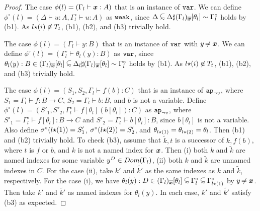\begin{proof}
  The case $\phi(l)= (\Gamma_l\vdash \boldsymbol{x}:A)$ that is an instance of ${\tt var}$.
  We can define $\phi^\circ(l) = (\Delta\vdash u:A, \Gamma^\circ_l\vdash u:A)$ as ${\tt weak}$,
  since $\Delta\subseteqsim \mergeCtx{\Delta}{\Restrict{(\Gamma_l)}{\overline{\xx}}[\theta_l]} \sim \Gamma^\circ_l$
  holds by (b1). 
  As $l{\star}(i)\not\in T_t$, (b1), (b2), and (b3) trivially hold.
  
  The case $\phi(l) = (\Gamma_l\vdash y:B)$ that is an instance of ${\tt var}$ with $y \not\nobreak\mkern -2mu = \boldsymbol{x}$. 
  We can define $\phi^\circ(l) = (\Gamma^\circ_l\vdash \theta_l(y):B)$ as ${\tt var}$,
  since $\theta_l(y):B \in \Restrict{(\Gamma_l)}{\overline{\xx}}[\theta_l] \subseteqsim \mergeCtx{\Delta_l}{\Restrict{(\Gamma_l)}{\overline{\xx}}[\theta_l]} \sim \Gamma^\circ_l$ holds by (b1).
  As $l{\star}(i)\not\in T_t$, (b1), (b2), and (b3) trivially hold.

  The case $\phi(l) = (S_1,S_2,\Gamma_l\vdash f(b):C)$ that is an instance of $\apnotvar$,
  where $S_1 = \Gamma_l\vdash f:B\to C$, $S_2 = \Gamma_l\vdash b:B$, and $b$ is not a variable. 
  Define $\phi^\circ(l) = (S'_1, S'_2,\Gamma^\circ_l\vdash f[\theta_l](b[\theta_l]):C)$ as $\apnotvar$, 
  where $S'_1 = \Gamma^\circ_l\vdash f[\theta_l]:B\to C$ and $S'_2 = \Gamma^\circ_l\vdash b[\theta_l]:B$,
  since $b[\theta_l]$ is not a variable.
  Also define $\sigma^\circ(l{\star}(1)) = S'_1$, $\sigma^\circ(l{\star}(2)) = S'_2$,
  and $\theta_{l{\star}(1)} = \theta_{l{\star}(2)} = \theta_l$. 
  Then (b1) and (b2) trivially hold.
  To check (b3),
  assume that $\tilde{k},t$ is a successor of $k,f(b)$, where $t$ is $f$ or $b$,
  and $k$ is not a named index for $\boldsymbol{x}$.
  Then (i) both $k$ and $\tilde{k}$ are named indexes for some variable $y^D\in{{\relax Dom}}(\Gamma_l)$,
  (ii) both $k$ and $\tilde{k}$ are unnamed indexes in $C$. 
  For the case (ii), take $k'$ and $\tilde{k'}$ as the same indexes as $k$ and $\tilde{k}$, respectively.
  For the case (i), we have
  $\theta_l(y):D \in \Restrict{(\Gamma_l)}{\overline{\xx}}[\theta_l] \subseteqsim \Gamma^\circ_l \subseteqsim \Gamma^\circ_{l\conc(1)}$ 
  by $y \not\nobreak\mkern -2mu = \boldsymbol{x}$. Then take $k'$ and $\tilde{k'}$ as named indexes for $\theta_l(y)$.
  In each case, $k'$ and $\tilde{k'}$ satisfy (b3) as expected. 
  

\end{proof}
